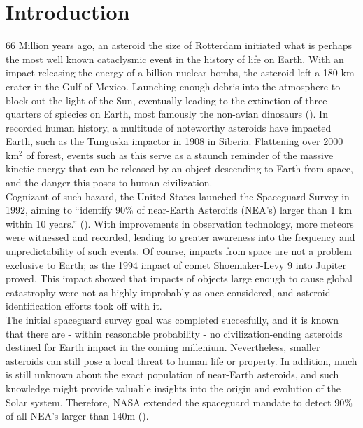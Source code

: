 \chapter{Introduction}
\label{ch:introduction}
66 Million years ago, an asteroid the size of Rotterdam initiated what is perhaps the most well known cataclysmic event in the history of life on Earth. With an impact releasing the energy of a billion nuclear bombs, the asteroid left a 180 km crater in the Gulf of Mexico. Launching enough debris into the atmosphere to block out the light of the Sun, eventually leading to the extinction of three quarters of spiecies on Earth, most famously the non-avian dinosaurs (\cite{DinosaurAsteroid}). In recorded human history, a multitude of noteworthy asteroids have impacted Earth, such as the Tunguska impactor in 1908 in Siberia. Flattening over 2000 km$^2$ of forest, events such as this serve as a staunch reminder of the massive kinetic energy that can be released by an object descending to Earth from space, and the danger this poses to human civilization.\\

Cognizant of such hazard, the United States launched the Spaceguard Survey in 1992, aiming to ``identify 90\% of near-Earth Asteroids (NEA's) larger than 1 km within 10 years.'' (\cite{Spaceguard}). With improvements in observation technology, more meteors were witnessed and recorded, leading to greater awareness into the frequency and unpredictability of such events. Of course, impacts from space are not a problem exclusive to Earth; as the 1994 impact of comet Shoemaker-Levy 9 into Jupiter proved. This impact showed that impacts of objects large enough to cause global catastrophy were not as highly improbably as once considered, and asteroid identification efforts took off with it.\\

The initial spaceguard survey goal was completed succesfully, and it is known that there are - within reasonable probability - no civilization-ending asteroids destined for Earth impact in the coming millenium. Nevertheless, smaller asteroids can still pose a local threat to human life or property. In addition, much is still unknown about the exact population of near-Earth asteroids, and such knowledge might provide valuable insights into the origin and evolution of the Solar system. Therefore, NASA extended the spaceguard mandate to detect 90\% of all NEA's larger than 140m (\cite{SpaceguardHistory}). \\


